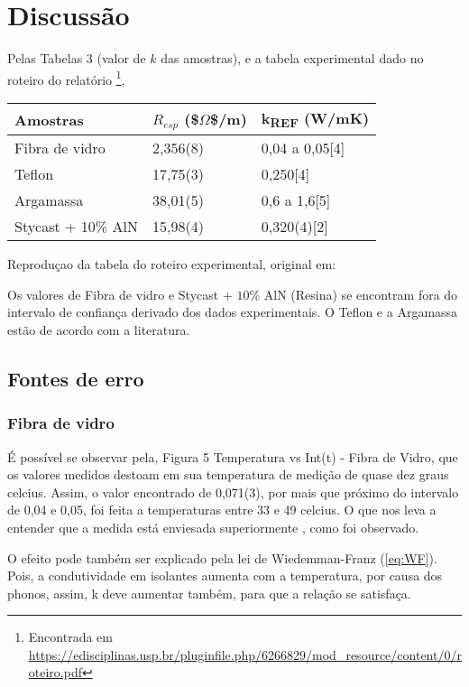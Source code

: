 \documentclass[11pt]{article}
\date{\today}
\title{}
\begin{document}
\tableofcontents

\section{Discussão}
\label{sec:orgd4d09af}

Pelas Tabelas 3 (valor de $k$ das amostras), e a tabela experimental dado no roteiro do relatório \footnote{Encontrada em \url{https://edisciplinas.usp.br/pluginfile.php/6266829/mod_resource/content/0/roteiro.pdf}},

\begin{center}
\begin{tabular}{lll}
\hline
Amostras & \(R_{esp}\) (\$\(\Omega\)\$/m) & k\textsubscript{REF} (W/mK)\\
\hline
Fibra de vidro & 2,356(8) & 0,04 a 0,05[4]\\
Teflon & 17,75(3) & 0,250[4]\\
Argamassa & 38,01(5) & 0,6 a 1,6[5]\\
Stycast + 10\% AlN & 15,98(4) & 0,320(4)[2]\\
\hline
\end{tabular}
\end{center}
Reproduçao  da tabela do roteiro experimental, original em: \cite{rebeca2021}

Os valores de Fibra de vidro e Stycast + $10\%$ AlN (Resina) se encontram fora do intervalo de confiança derivado dos dados experimentais. O Teflon e a Argamassa estão de acordo com a literatura.

\subsection{Fontes de erro}
\label{sec:org27db562}
\subsubsection{Fibra de vidro}
\label{sec:orgca0f2bb}
É possível se observar pela, Figura 5 Temperatura vs Int(t) - Fibra de Vidro, que os valores medidos destoam em sua temperatura de medição de quase dez graus celcius. Assim, o valor encontrado de 0,071(3), por mais que próximo do intervalo de 0,04 e 0,05, foi feita a temperaturas entre 33 e 49 celcius. O que nos leva a entender que a medida está enviesada superiormente \cite{ochs2005temperature,budaiwi2002variations}, como foi observado.

O efeito pode também ser explicado pela lei de Wiedemman-Franz (\autoref{eq:WF}). Pois, a condutividade em isolantes aumenta com a temperatura, por causa dos phonos, assim, k deve aumentar também, para que a relação se satisfaça.
\end{document}
